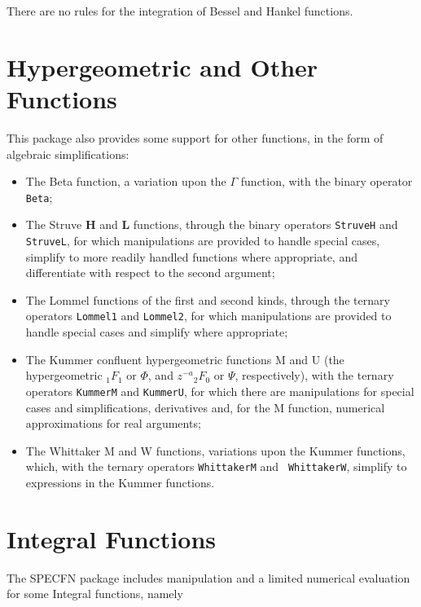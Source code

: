 There are no rules for the integration of Bessel and Hankel functions.


\section{Hypergeometric and Other Functions}

This package also provides some support for other functions, in the form
of algebraic simplifications:
\begin{itemize}
\item The Beta function, a variation upon the $\Gamma$
function\cite{Abramowitz:72}, with the binary operator {\tt Beta};
\item The Struve {\bf H} and {\bf L} functions, through the binary
operators {\tt StruveH} and {\tt StruveL}, for which manipulations are
provided to handle special cases, simplify to more readily handled
functions where appropriate, and differentiate with respect to the second
argument;
\item The Lommel functions of the first and second kinds, through the
ternary operators {\tt Lommel1} and {\tt Lommel2}, for which manipulations
are provided to handle special cases and simplify where appropriate;
\item The Kummer confluent hypergeometric functions M and U (the
hypergeometric ${_1F_1}$ or $\Phi$, and $z^{-a}{_2F_0}$ or $\Psi$,
respectively),
with the ternary operators {\tt KummerM} and {\tt KummerU}, for which
there are manipulations for special cases and simplifications, derivatives
and, for the M function, numerical approximations for real arguments;
\item The Whittaker M and W functions, variations upon the Kummer
functions, which, with the ternary operators {\tt WhittakerM} and {\tt
WhittakerW}, simplify to expressions in the Kummer functions.
\end{itemize}

\section{Integral Functions}

The SPECFN package includes manipulation and a limited numerical
evaluation for some Integral functions, namely

